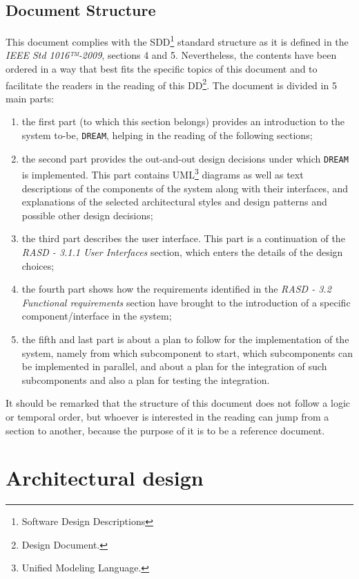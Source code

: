 \documentclass{article}
\begin{document}
\subsection{Document Structure}
This document complies with the SDD\footnote{Software Design Descriptions} standard structure as it is defined in the \textit{IEEE Std 1016™-2009}, sections 4 and 5. Nevertheless, the contents have been ordered in a way that best fits the specific topics of this document and to facilitate the readers in the reading of this DD\footnote{Design Document.}.
The document is divided in 5 main parts:
\begin{enumerate}
\item the first part (to which this section belongs) provides an introduction to the system to-be, \verb|DREAM|, helping in the reading of the following sections;
\item the second part provides the out-and-out design decisions under which \verb|DREAM| is implemented. This part contains UML\footnote{Unified Modeling Language.} diagrams as well as text descriptions of the components of the system along with their interfaces, and explanations of the selected architectural styles and design patterns and possible other design decisions;
\item the third part describes the user interface. This part is a continuation of the \textit{RASD - 3.1.1 User Interfaces} section, which enters the details of the design choices;
\item the fourth part shows how the requirements identified in the \textit{RASD - 3.2 Functional requirements} section have brought to the introduction of a specific component/interface in the system;
\item the fifth and last part is about a plan to follow for the implementation of the system, namely from which subcomponent to start, which subcomponents can be implemented in parallel, and about a plan for the integration of such subcomponents and also a plan for testing the integration.
\end{enumerate}
It should be remarked that the structure of this document does not follow a logic or temporal order, but whoever is interested in the reading can jump from a section to another, because the purpose of it is to be a reference document.\newpage
\section{Architectural design}
\end{document}
